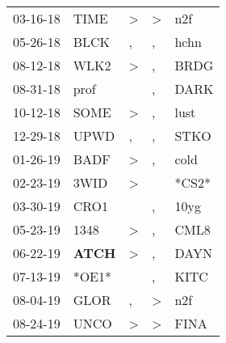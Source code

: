 \begin{supertabular}{p{0.07\textwidth}p{0.06\textwidth}p{0.02\textwidth}p{0.02\textwidth}p{0.06\textwidth}}
          03-16-18\textsuperscript{} &           TIME\textsuperscript{} &     \textgreater &     \textgreater &            n2f\textsuperscript{} \\
          05-26-18\textsuperscript{} &           BLCK\textsuperscript{} &                , &                , &           hchn\textsuperscript{} \\
          08-12-18\textsuperscript{} &           WLK2\textsuperscript{} &     \textgreater &                , &           BRDG\textsuperscript{} \\
          08-31-18\textsuperscript{} &           prof\textsuperscript{} &                  &                , &           DARK\textsuperscript{} \\
          10-12-18\textsuperscript{} &           SOME\textsuperscript{} &     \textgreater &                , &           lust\textsuperscript{} \\
          12-29-18\textsuperscript{} &           UPWD\textsuperscript{} &                , &                , &           STKO\textsuperscript{} \\
          01-26-19\textsuperscript{} &           BADF\textsuperscript{} &     \textgreater &                , &           cold\textsuperscript{} \\
          02-23-19\textsuperscript{} &           3WID\textsuperscript{} &     \textgreater &                  &                            *CS2* \\
          03-30-19\textsuperscript{} &           CRO1\textsuperscript{} &                  &                , &           10yg\textsuperscript{} \\
          05-23-19\textsuperscript{} &           1348\textsuperscript{} &     \textgreater &                , &           CML8\textsuperscript{} \\
          06-22-19\textsuperscript{} &  \textbf{ATCH\textsuperscript{}} &     \textgreater &                , &           DAYN\textsuperscript{} \\
          07-13-19\textsuperscript{} &                            *OE1* &                  &                , &           KITC\textsuperscript{} \\
          08-04-19\textsuperscript{} &           GLOR\textsuperscript{} &                , &     \textgreater &            n2f\textsuperscript{} \\
          08-24-19\textsuperscript{} &           UNCO\textsuperscript{} &     \textgreater &     \textgreater &           FINA\textsuperscript{} \\

\end{supertabular}
